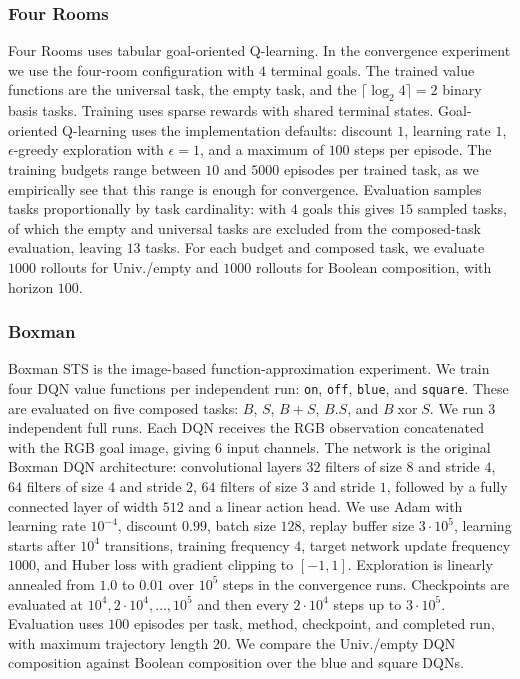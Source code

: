\subsubsection{Four Rooms}
\label{app:design-four-rooms}

Four Rooms uses tabular goal-oriented Q-learning.
In the convergence experiment we use the four-room configuration with $4$ terminal goals.
The trained value functions are the universal task, the empty task, and the $\lceil\log_2 4\rceil=2$ binary basis tasks.
Training uses sparse rewards with shared terminal states.
Goal-oriented Q-learning uses the implementation defaults: discount $1$, learning rate $1$, $\epsilon$-greedy exploration with $\epsilon=1$, and a maximum of $100$ steps per episode.
The training budgets range between $10$ and $5000$ episodes per trained task, as we empirically see that this range is enough for convergence.
Evaluation samples tasks proportionally by task cardinality: with $4$ goals this gives $15$ sampled tasks, of which the empty and universal tasks are excluded from the composed-task evaluation, leaving $13$ tasks.
For each budget and composed task, we evaluate $1000$ rollouts for Univ./empty and $1000$ rollouts for Boolean composition, with horizon $100$.

\subsubsection{Boxman}
\label{app:design-boxman-sts}

Boxman STS is the image-based function-approximation experiment.
We train four DQN value functions per independent run: \texttt{on}, \texttt{off}, \texttt{blue}, and \texttt{square}.
These are evaluated on five composed tasks: $B$, $S$, $B+S$, $B.S$, and $B\operatorname{xor}S$.
We run $3$ independent full runs.
Each DQN receives the RGB observation concatenated with the RGB goal image, giving $6$ input channels.
The network is the original Boxman DQN architecture: convolutional layers $32$ filters of size $8$ and stride $4$, $64$ filters of size $4$ and stride $2$, $64$ filters of size $3$ and stride $1$, followed by a fully connected layer of width $512$ and a linear action head.
We use Adam with learning rate $10^{-4}$, discount $0.99$, batch size $128$, replay buffer size $3\cdot10^5$, learning starts after $10^4$ transitions, training frequency $4$, target network update frequency $1000$, and Huber loss with gradient clipping to $[-1,1]$.
Exploration is linearly annealed from $1.0$ to $0.01$ over $10^5$ steps in the convergence runs.
Checkpoints are evaluated at $10^4,2\cdot10^4,\ldots,10^5$ and then every $2\cdot10^4$ steps up to $3\cdot10^5$.
Evaluation uses $100$ episodes per task, method, checkpoint, and completed run, with maximum trajectory length $20$.
We compare the Univ./empty DQN composition against Boolean composition over the blue and square DQNs.

